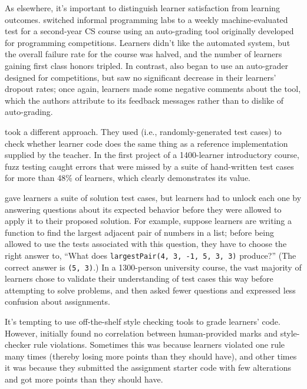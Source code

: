 As elsewhere, it's important to distinguish learner satisfaction from
learning outcomes. \cite{Magu2018} switched informal programming labs
to a weekly machine-evaluated test for a second-year CS course using an
auto-grading tool originally developed for programming competitions.
Learners didn't like the automated system, but the overall failure rate
for the course was halved, and the number of learners gaining first
class honors tripled. In contrast, \cite{Rubi2014} also began to use
an auto-grader designed for competitions, but saw no significant
decrease in their learners' dropout rates; once again, learners made
some negative comments about the tool, which the authors attribute to
its feedback messages rather than to dislike of auto-grading.

\cite{Srid2016} took a different approach. They used
 (i.e., randomly-generated
test cases) to check whether learner code does the same thing as a
reference implementation supplied by the teacher. In the first project
of a 1400-learner introductory course, fuzz testing caught errors that
were missed by a suite of hand-written test cases for more than 48\% of
learners, which clearly demonstrates its value.

\cite{Basu2015} gave learners a suite of solution test cases, but
learners had to unlock each one by answering questions about its
expected behavior before they were allowed to apply it to their proposed
solution. For example, suppose learners are writing a function to find
the largest adjacent pair of numbers in a list; before being allowed to
use the tests associated with this question, they have to choose the
right answer to, ``What does \texttt{largestPair(4,\ 3,\ -1,\ 5,\ 3,\ 3)} produce?''
(The correct answer is \texttt{(5,\ 3)}.) In a 1300-person university course,
the vast majority of learners chose to validate their understanding of
test cases this way before attempting to solve problems, and then asked
fewer questions and expressed less confusion about assignments.

It's tempting to use off-the-shelf style checking tools to grade
learners' code. However, \cite{Nutb2016} initially found no
correlation between human-provided marks and style-checker rule
violations. Sometimes this was because learners violated one rule many
times (thereby losing more points than they should have), and other
times it was because they submitted the assignment starter code with few
alterations and got more points than they should have.

